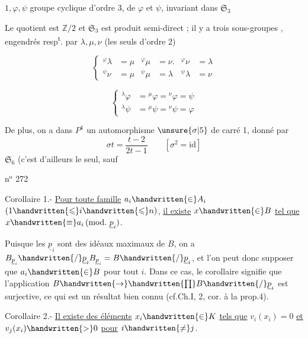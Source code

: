 $1,\varphi,\psi$ groupe cyclique d'ordre 3, de  $\varphi$ et $\psi$, invariant dans $\mathfrak{S}_3$

Le quotient est $\mathbb{Z}/2$ et $\mathfrak{S}_3$ est produit semi-direct ; il y a trois sous-groupes , engendrés resp\textsuperscript{t}. par $\lambda,\mu,\nu$ (les seuls  d'ordre 2)

\begingroup\makeatletter\tagsleft@true\makeatother
\[
\left\{\begin{aligned}
{}^\varphi\lambda&=\mu&{}^\varphi\mu&=\nu.&{}^\varphi\nu&=\lambda\\
{}^\psi\nu&=\mu&{}^\psi\mu&=\lambda&{}^{\psi}\lambda&=\nu
\end{aligned}\right.\tag*{4)}
\]
\endgroup

\begingroup\makeatletter\tagsleft@true\makeatother
\[
\left\{\begin{aligned}
{}^\lambda\varphi&={}^\mu\varphi={}^\nu\varphi=\psi\\
{}^\lambda\psi&={}^\mu\psi={}^\nu\psi=\varphi
\end{aligned}\right.\tag*{5)}
\]
\endgroup

De plus, on a dans $P^1$ un automorphisme $\unsure{\sigma|5}$  de carré 1, donné par
\begingroup\makeatletter\tagsleft@true\makeatother
\[
\sigma t=\frac{t-2}{2t-1}\qquad[\sigma^2=\mathrm{id}]\tag*{6)}
\]
\endgroup
{} $\mathfrak{S}_{6}$ (c'est d'ailleurs le seul, sauf

\hfill n$^{\mathrm{o}}$ 272

Corollaire 1.- \uline{Pour toute famille} $a_i\handwritten{\in} A_i$ $(1\handwritten{\leqslant}i\handwritten{\leqslant}n)$, \uline{il existe} $x\handwritten{\in}B$ \uline{tel que} $x\handwritten{\equiv}a_i\,(\mathrm{mod.}\ \underline{p}_i)$.

Puisque les $\underline{p}_i$ sont des idéaux maximaux de $B$, on a $B_{\underline{p}_i}\handwritten{/}\underline{p}_i B_{\underline{p}_i}=B\handwritten{/}\underline{p}_i$, et l'on peut donc supposer que $a_i\handwritten{\in}B$ pour tout $i$. Dans ce cas, le corollaire signifie que l'application $B\handwritten{\to}\handwritten{\prod} B\handwritten{/}\underline{p}_i$ est surjective, ce qui est un résultat bien connu (cf.Ch.I, \handwritten{\S}2, cor. à la prop.4).

Corollaire 2.- \uline{Il existe des éléments} $x_i\handwritten{\in}K$ \uline{tels que} $v_i(x_i)=0$ \uline{et} $v_j(x_i)\handwritten{>}0$ \uline{pour} $i\handwritten{\ne}j$.

